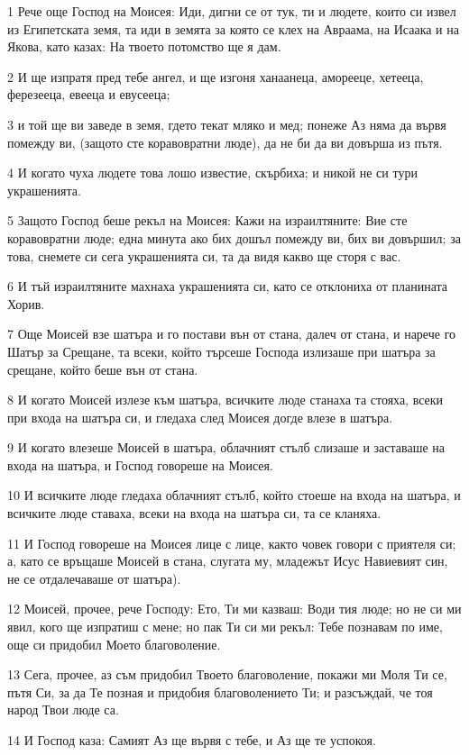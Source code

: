 \par 1 Рече още Господ на Моисея: Иди, дигни се от тук, ти и людете, които си извел из Египетската земя, та иди в земята за която се клех на Авраама, на Исаака и на Якова, като казах: На твоето потомство ще я дам.
\par 2 И ще изпратя пред тебе ангел, и ще изгоня ханаанеца, аморееце, хетееца, ферезееца, евееца и евусееца;
\par 3 и той ще ви заведе в земя, гдето текат мляко и мед; понеже Аз няма да вървя помежду ви, (защото сте коравовратни люде), да не би да ви довърша из пътя.
\par 4 И когато чуха людете това лошо известие, скърбиха; и никой не си тури украшенията.
\par 5 Защото Господ беше рекъл на Моисея: Кажи на израилтяните: Вие сте коравовратни люде; една минута ако бих дошъл помежду ви, бих ви довършил; за това, снемете си сега украшенията си, та да видя какво ще сторя с вас.
\par 6 И тъй израилтяните махнаха украшенията си, като се отклониха от планината Хорив.
\par 7 Още Моисей взе шатъра и го постави вън от стана, далеч от стана, и нарече го Шатър за Срещане, та всеки, който търсеше Господа излизаше при шатъра за срещане, който беше вън от стана.
\par 8 И когато Моисей излезе към шатъра, всичките люде станаха та стояха, всеки при входа на шатъра си, и гледаха след Моисея догде влезе в шатъра.
\par 9 И когато влезеше Моисей в шатъра, облачният стълб слизаше и заставаше на входа на шатъра, и Господ говореше на Моисея.
\par 10 И всичките люде гледаха облачният стълб, който стоеше на входа на шатъра, и всичките люде ставаха, всеки на входа на шатъра си, та се кланяха.
\par 11 И Господ говореше на Моисея лице с лице, както човек говори с приятеля си; а, като се връщаше Моисей в стана, слугата му, младежът Исус Навиевият син, не се отдалечаваше от шатъра).
\par 12 Моисей, прочее, рече Господу: Ето, Ти ми казваш: Води тия люде; но не си ми явил, кого ще изпратиш с мене; но пак Ти си ми рекъл: Тебе познавам по име, още си придобил Моето благоволение.
\par 13 Сега, прочее, аз съм придобил Твоето благоволение, покажи ми Моля Ти се, пътя Си, за да Те позная и придобия благоволението Ти; и разсъждай, че тоя народ Твои люде са.
\par 14 И Господ каза: Самият Аз ще вървя с тебе, и Аз ще те успокоя.
